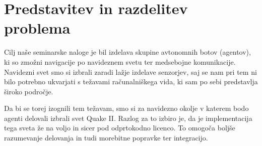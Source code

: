 \documentclass[a4paper,10pt]{article}
\begin{document}

\tableofcontents
\pagebreak

\section{Predstavitev in razdelitev problema}

Cilj naše seminarske naloge je bil izdelava skupine avtonomnih botov (agentov), ki so zmožni navigacije po navideznem svetu ter medsebojne komunikacije. Navidezni svet smo si izbrali zaradi lažje izdelave senzorjev, saj se nam pri tem ni bilo potrebno ukvarjati s težavami računalniškega vida, ki sam po sebi predstavlja široko področje.

Da bi se torej izognili tem težavam, smo si za navidezno okolje v katerem bodo agenti delovali izbrali svet Quake II. Razlog za to izbiro je, da je implementacija tega sveta že na voljo in sicer pod odprtokodno licenco. To omogoča boljše razumevanje delovanja in tudi morebitne popravke ter integracijo.
\end{document}
